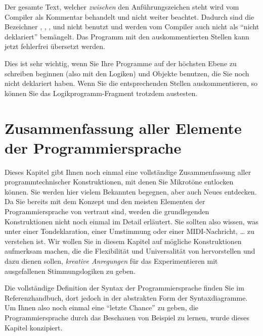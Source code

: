 Der gesamte Text, welcher \emph{zwischen} den Anführungszeichen steht
wird vom Compiler als Kommentar behandelt und nicht weiter beachtet.
Dadurch sind die Bezeichner , , ,
 und  nicht benutzt und
werden vom Compiler auch nicht als "`nicht deklariert"' bemängelt. 
Das Programm mit den auskommentierten Stellen kann jetzt fehlerfrei 
übersetzt werden.

Dies ist sehr wichtig, wenn Sie Ihre Programme auf der höchsten 
Ebene zu schreiben beginnen (also mit den Logiken) und Objekte benutzen, 
die Sie noch nicht deklariert haben. Wenn Sie die entsprechenden 
Stellen auskommentieren, so können Sie das Logikprogramm-Fragment 
trotzdem austesten. 

\setcounter{savedchapter}{\value{chapter}}
\let\savedchaptercommand\chapter

\appendix

\chapter[Programmiersprache -- Zusammenfassung]{Zusammenfassung aller Elemente der Programmiersprache}\label{cha:zusamm-aller-elem}
\label{anhang:programmieren}
Dieses Kapitel gibt Ihnen noch einmal eine vollständige
Zusammenfassung aller programmtechnischer Konstruktionen, mit denen
Sie \mutabor{} Mikrotöne entlocken können. Sie werden hier vielem
Bekannten begegnen, aber auch Neues entdecken. Da Sie bereits mit dem
Konzept und den meisten Elementen der Programmiersprache von \mutabor{}
vertraut sind, werden die grundlegenden Konstruktionen nicht noch
einmal im Detail erläutert. Sie sollten also wissen, was unter einer
Tondeklaration, einer Umstimmung oder einer MIDI-Nachricht, \dots{}  zu
verstehen ist. Wir wollen Sie in diesem Kapitel auf mögliche
Konstruktionen aufmerksam machen, die die Flexibilität und
Universalität von \mutabor{} hervorstellen und dazu dienen sollen, {\em
  kreative Anregungen} für das Experimentieren mit ausgefallenen
Stimmungslogiken zu geben.

Die vollständige Definition der Syntax der Programmiersprache finden
Sie im Referenzhandbuch, dort jedoch in der abstrakten Form der
Syntaxdiagramme. Um Ihnen also noch einmal eine "`letzte Chance"' zu
geben, die Programmiersprache durch das Beschauen von Beispiel zu
lernen, wurde dieses Kapitel konzipiert.

